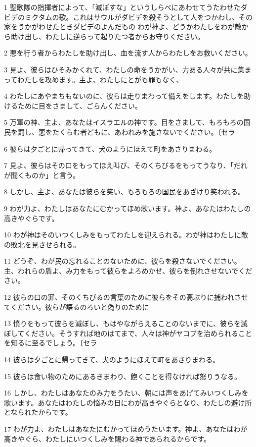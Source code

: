 \par 1 聖歌隊の指揮者によって、「滅ぼすな」というしらべにあわせてうたわせたダビデのミクタムの歌。これはサウルがダビデを殺そうとして人をつかわし、その家をうかがわせたときダビデのよんだもの わが神よ、どうかわたしをわが敵から助け出し、わたしに逆らって起りたつ者からお守りください。
\par 2 悪を行う者からわたしを助け出し、血を流す人からわたしをお救いください。
\par 3 見よ、彼らはひそみかくれて、わたしの命をうかがい、力ある人々が共に集まってわたしを攻めます。主よ、わたしにとがも罪もなく、
\par 4 わたしにあやまちもないのに、彼らは走りまわって備えをします。わたしを助けるために目をさまして、ごらんください。
\par 5 万軍の神、主よ、あなたはイスラエルの神です。目をさまして、もろもろの国民を罰し、悪をたくらむ者どもに、あわれみを施さないでください。〔セラ
\par 6 彼らは夕ごとに帰ってきて、犬のようにほえて町をあさりまわる。
\par 7 見よ、彼らはその口をもってほえ叫び、そのくちびるをもってうなり、「だれが聞くものか」と言う。
\par 8 しかし、主よ、あなたは彼らを笑い、もろもろの国民をあざけり笑われる。
\par 9 わが力よ、わたしはあなたにむかってほめ歌います。神よ、あなたはわたしの高きやぐらです。
\par 10 わが神はそのいつくしみをもってわたしを迎えられる。わが神はわたしに敵の敗北を見させられる。
\par 11 どうぞ、わが民の忘れることのないために、彼らを殺さないでください。主、われらの盾よ、み力をもって彼らをよろめかせ、彼らを倒れさせないでください。
\par 12 彼らの口の罪、そのくちびるの言葉のために彼らをその高ぶりに捕われさせてください。彼らが語るのろいと偽りのために
\par 13 憤りをもって彼らを滅ぼし、もはやながらえることのないまでに、彼らを滅ぼしてください。そうすれば地のはてまで、人々は神がヤコブを治められることを知るに至るでしょう。〔セラ
\par 14 彼らは夕ごとに帰ってきて、犬のようにほえて町をあさりまわる。
\par 15 彼らは食い物のためにあるきまわり、飽くことを得なければ怒りうなる。
\par 16 しかし、わたしはあなたのみ力をうたい、朝には声をあげてみいつくしみを歌います。あなたはわたしの悩みの日にわが高きやぐらとなり、わたしの避け所となられたからです。
\par 17 わが力よ、わたしはあなたにむかってほめうたいます。神よ、あなたはわが高きやぐら、わたしにいつくしみを賜わる神であられるからです。

